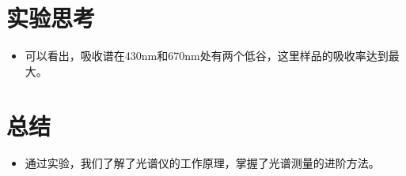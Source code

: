 \documentclass{ctexart}
\begin{document}
\section{实验思考}
\begin{itemize}
    \item 可以看出，吸收谱在430nm和670nm处有两个低谷，这里样品的吸收率达到最大。
\end{itemize}
\section{总结}
\begin{itemize}
\item 通过实验，我们了解了光谱仪的工作原理，掌握了光谱测量的进阶方法。
\end{itemize}
\end{document}
